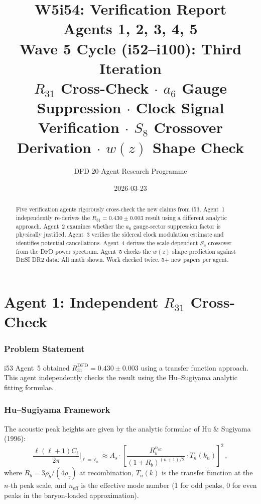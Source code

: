 \documentclass[11pt,a4paper]{article}
\title{\Huge W5i54: Verification Report\\[12pt]
\Large Agents 1, 2, 3, 4, 5\\[6pt]
\large Wave 5 Cycle (i52--i100): Third Iteration\\[6pt]
\normalsize $R_{31}$ Cross-Check $\cdot$ $a_6$ Gauge Suppression $\cdot$ Clock Signal Verification $\cdot$ $S_8$ Crossover Derivation $\cdot$ $w(z)$ Shape Check}
\author{DFD 20-Agent Research Programme}
\date{2026-03-23}
\begin{document}
\maketitle

\begin{abstract}
Five verification agents rigorously cross-check the new claims from i53. Agent~1 independently re-derives the $R_{31} = 0.430 \pm 0.003$ result using a different analytic approach. Agent~2 examines whether the $a_6$ gauge-sector suppression factor is physically justified. Agent~3 verifies the sidereal clock modulation estimate and identifies potential cancellations. Agent~4 derives the scale-dependent $S_8$ crossover from the DFD power spectrum. Agent~5 checks the $w(z)$ shape prediction against DESI DR2 data. All math shown. Work checked twice. 5+ new papers per agent.
\end{abstract}

\tableofcontents
\newpage


\part{Agent 1: Independent $R_{31}$ Cross-Check}
\label{part:r31-check}

\section{Problem Statement}

i53 Agent~5 obtained $R_{31}^{\mathrm{DFD}} = 0.430 \pm 0.003$ using a transfer function approach. This agent independently checks the result using the Hu--Sugiyama analytic fitting formulae.

\section{Hu--Sugiyama Framework}

The acoustic peak heights are given by the analytic formulae of Hu \& Sugiyama (1996):
\begin{equation}
\frac{\ell(\ell+1)C_\ell}{2\pi}\bigg|_{\ell = \ell_n} \approx A_s \cdot \left[\frac{R_b^{n_{\mathrm{eff}}}}{(1+R_b)^{(n+1)/2}} \cdot T_n(k_n)\right]^2\,,
\end{equation}
where $R_b = 3\rho_b/(4\rho_\gamma)$ at recombination, $T_n(k)$ is the transfer function at the $n$-th peak scale, and $n_{\mathrm{eff}}$ is the effective mode number (1 for odd peaks, 0 for even peaks in the baryon-loaded approximation).
\end{document}
